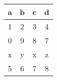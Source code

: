 \begin{tabular}{|c|c|c|c|}
\hline
a&b&c&d\\ \hline
1&2&3&4\\ \hline
0&9&8&7\\ \hline
x&y&x&z\\ \hline
5&6&7&8\\ \hline
\end{tabular}